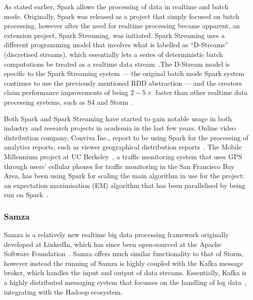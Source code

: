 \documentclass[a4paper,11pt]{article}
\begin{document}
As stated earlier, Spark allows the processing of data in realtime and batch mode. Originally, Spark was released as a
project that simply focused on batch processing, however after the need for realtime processing became apparent, an
extension project, Spark Streaming, was initiated. Spark Streaming uses a different programming model that involves what
is labelled as ``D-Streams'' (discretised streams), which essentially lets a series of deterministic batch computations
be treated as a realtime data stream~\cite{zaharia2012discretized}.The D-Stream model is specific to the Spark Streaming
system --- the original batch mode Spark system continues to use the previously mentioned RDD abstraction --- and the
creators claim performance improvements of being $2-5\times$ faster than  other realtime data processing systems, such as S4
and Storm~\cite{zaharia2013discretized}.

Both Spark and Spark Streaming have started to gain notable usage in both industry and research projects in academia in
the last few years. Online video distribution company, Conviva Inc., report to be using Spark for the processing of
analytics reports, such as viewer geographical distribution reports~\cite{web_spark_conviva,zaharia2012fast}. The Mobile
Millennium project at UC Berkeley~\cite{web_spark_mmp}, a traffic monitoring system that uses GPS through users'
cellular phones for traffic monitoring in the San Francisco Bay Area, has been using Spark for scaling the main
algorithm in use for the project: an expectation maximisation (EM) algorithm that has been parallelised by being run on
Spark~\cite{hunter2011scaling}.


\subsubsection{Samza} %
\label{ssub:samza}

Samza is a relatively new realtime big data processing framework originally developed at LinkedIn, which has since been
open-sourced at the Apache Software Foundation~\cite{web_samza}. Samza offers much similar functionality to that of
Storm, however instead the running of Samza is highly coupled with the Kafka message broker, which handles the input
and output of data streams. Essentially, Kafka is a highly distributed messaging system that focusses on the handling
of log data~\cite{kreps2011kafka}, integrating with the Hadoop ecosystem.
\end{document}
